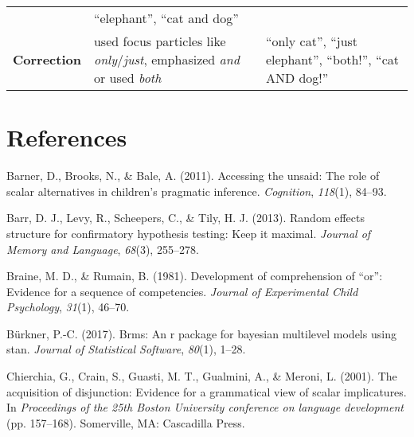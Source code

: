 \documentclass[,man,floatsintext]{apa6}
\begin{document}
\begin{longtable}[]{@{}lll@{}}
\begin{minipage}[t]{0.46\columnwidth}
\end{minipage} & \begin{minipage}[t]{0.31\columnwidth}\raggedright
\enquote{elephant}, \enquote{cat and dog}\strut
\end{minipage}\tabularnewline
\begin{minipage}[t]{0.14\columnwidth}\raggedright
\textbf{Correction}\strut
\end{minipage} & \begin{minipage}[t]{0.46\columnwidth}\raggedright
used focus particles like \emph{only}/\emph{just}, emphasized \emph{and} or used \emph{both}\strut
\end{minipage} & \begin{minipage}[t]{0.31\columnwidth}\raggedright
\enquote{only cat}, \enquote{just elephant}, \enquote{both!}, \enquote{cat AND dog!}\strut
\end{minipage}\tabularnewline
\bottomrule
\end{longtable}

\hypertarget{references}{%
\section{References}\label{references}}

\setlength{\parindent}{-0.5in}
\setlength{\leftskip}{0.5in}

\hypertarget{refs}{}
\leavevmode\hypertarget{ref-barner2011accessing}{}%
Barner, D., Brooks, N., \& Bale, A. (2011). Accessing the unsaid: The role of scalar alternatives in children's pragmatic inference. \emph{Cognition}, \emph{118}(1), 84--93.

\leavevmode\hypertarget{ref-barr2013random}{}%
Barr, D. J., Levy, R., Scheepers, C., \& Tily, H. J. (2013). Random effects structure for confirmatory hypothesis testing: Keep it maximal. \emph{Journal of Memory and Language}, \emph{68}(3), 255--278.

\leavevmode\hypertarget{ref-braine1981development}{}%
Braine, M. D., \& Rumain, B. (1981). Development of comprehension of ``or'': Evidence for a sequence of competencies. \emph{Journal of Experimental Child Psychology}, \emph{31}(1), 46--70.

\leavevmode\hypertarget{ref-burkner2017brms}{}%
Bürkner, P.-C. (2017). Brms: An r package for bayesian multilevel models using stan. \emph{Journal of Statistical Software}, \emph{80}(1), 1--28.

\leavevmode\hypertarget{ref-chierchia2001acquisition}{}%
Chierchia, G., Crain, S., Guasti, M. T., Gualmini, A., \& Meroni, L. (2001). The acquisition of disjunction: Evidence for a grammatical view of scalar implicatures. In \emph{Proceedings of the 25th Boston University conference on language development} (pp. 157--168). Somerville, MA: Cascadilla Press.
\end{document}
